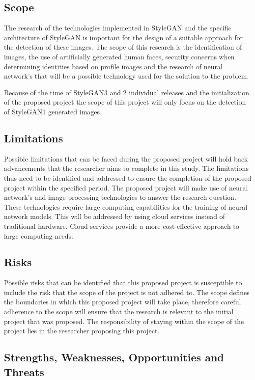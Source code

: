 \subsection{Scope}
The research of the technologies implemented in StyleGAN and the specific architecture of StyleGAN is important for the design of a suitable approach for the detection of these images. The scope of this research is the identification of images, the use of artificially generated human faces, security concerns when determining identities based on profile images and the research of neural network's that will be a possible technology used for the solution to the problem.

Because of the time of StyleGAN3 and 2 individual releases and the initialization of the proposed project the scope of this project will only focus on the detection of StyleGAN1 generated images. 


\subsection{Limitations}

Possible limitations that can be faced during the proposed project will hold back advancements that the researcher aims to complete in this study. The limitations thus need to be identified and addressed to ensure the completion of the proposed project within the specified period. The proposed project will make use of neural network's and image processing technologies to answer the research question. These technologies require large computing capabilities for the training of neural network models. This will be addressed by using cloud services instead of traditional hardware. Cloud services provide a more cost-effective approach to large computing needs.

\subsection{Risks}

Possible risks that can be identified that this proposed project is susceptible to include the risk that the scope of the project is not adhered to. The scope defines the boundaries in which this proposed project will take place, therefore careful adherence to the scope will ensure that the research is relevant to the initial project that was proposed. The responsibility of staying within the scope of the project lies in the researcher proposing this project.

\subsection{Strengths, Weaknesses, Opportunities and Threats}

